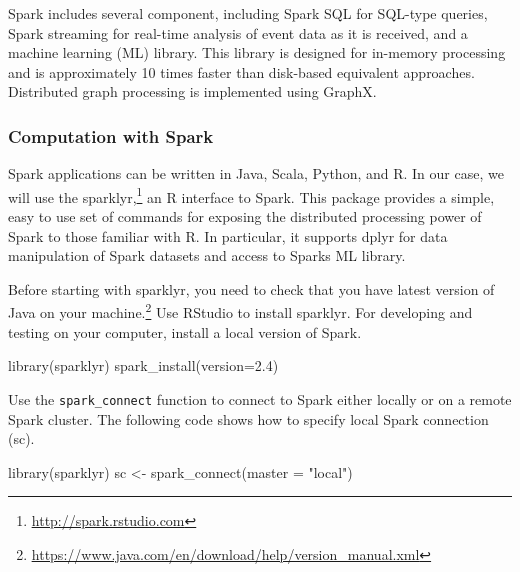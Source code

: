 \documentclass[
]{article}
\newenvironment{Shaded}{\begin{snugshade}}{\end{snugshade}}
\newcommand{\AttributeTok}[1]{\textcolor[rgb]{0.77,0.63,0.00}{#1}}
\newcommand{\FunctionTok}[1]{\textcolor[rgb]{0.00,0.00,0.00}{#1}}
\newcommand{\NormalTok}[1]{#1}
\newcommand{\OtherTok}[1]{\textcolor[rgb]{0.56,0.35,0.01}{#1}}
\newcommand{\StringTok}[1]{\textcolor[rgb]{0.31,0.60,0.02}{#1}}
\begin{document}
Spark includes several component, including Spark SQL for SQL-type
queries, Spark streaming for real-time analysis of event data as it is
received, and a machine learning (ML) library. This library is designed
for in-memory processing and is approximately 10 times faster than
disk-based equivalent approaches. Distributed graph processing is
implemented using GraphX.

\hypertarget{computation-with-spark}{%
\subsubsection*{Computation with Spark}\label{computation-with-spark}}

Spark applications can be written in Java, Scala, Python, and R. In our
case, we will use the sparklyr,\footnote{\href{http://spark.rstudio.com}{\underline{http://spark.rstudio.com}}} an R interface to
Spark. This package provides a simple, easy to use set of commands for
exposing the distributed processing power of Spark to those familiar
with R. In particular, it supports dplyr for data manipulation of Spark
datasets and access to Sparks ML library.

Before starting with sparklyr, you need to check that you have latest
version of Java on your machine.\footnote{\href{https://www.java.com/en/download/help/version_manual.xml}{\underline{https://www.java.com/en/download/help/version\_manual.xml}}} Use RStudio to
install sparklyr. For developing and testing on your computer, install a
local version of Spark.

\begin{Shaded}
\begin{Highlighting}[]
\FunctionTok{library}\NormalTok{(sparklyr)}
\FunctionTok{spark\_install}\NormalTok{(}\AttributeTok{version=}\StringTok{\textquotesingle{}2.4\textquotesingle{}}\NormalTok{)}
\end{Highlighting}
\end{Shaded}

Use the \texttt{spark\_connect} function to connect to Spark either locally or
on a remote Spark cluster. The following code shows how to specify local
Spark connection (sc).

\begin{Shaded}
\begin{Highlighting}[]
\FunctionTok{library}\NormalTok{(sparklyr)}
\NormalTok{sc }\OtherTok{\textless{}{-}} \FunctionTok{spark\_connect}\NormalTok{(}\AttributeTok{master =} \StringTok{"local"}\NormalTok{)}
\end{Highlighting}
\end{Shaded}
\end{document}
